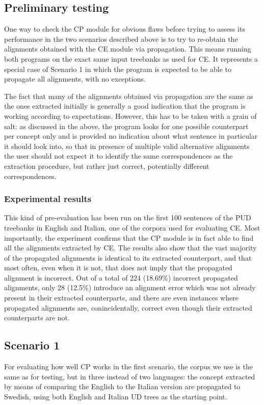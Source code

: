 \subsection{Preliminary testing} 
One way to check the CP module for obvious flaws before trying to assess its performance in the two scenarios described above is to try to re-obtain the alignments obtained with the CE module via propagation. This means running both programs on the exact same input treebanks as used for CE. It represents a special case of Scenario 1 in which the program is expected to be able to propagate all alignments, with no exceptions. \smallskip 

The fact that many of the alignments obtained via propagation are the same as the ones extracted initially is generally a good indication that the program is working according to expectations. However, this has to be taken with a grain of salt: as discussed in the above, the program looks for one possible counterpart per concept only and is provided no indication about what sentence in particular it should look into, so that in presence of multiple valid alternative alignments the user should not expect it to identify the same correspondences as the extraction procedure, but rather just correct, potentially different correspondences. 

\subsubsection{Experimental results} \label{eval4r}
This kind of pre-evaluation has been run on the first 100 sentences of the PUD treebanks in English and Italian, one of the corpora used for evaluating CE. Most importantly, the experiment confirms that the CP module is in fact able to find all the alignments extracted by CE. 
The results also show that the vast majority of the propagated alignments is identical to its extracted counterpart, and that most often, even when it is not, that does not imply that the propagated alignment is incorrect. Out of a total of 224 (18.69\%) incorrect propagated alignments, only 28 (12.5\%) introduce an alignment error which was not already present in their extracted counterparts, and there are even instances where propagated alignments are, conincidentally, correct even though their extracted counterparts are not.

\subsection{Scenario 1}
For evaluating how well CP works in the first scenario, the corpus we use is the same as for testing, but in three instead of two languages: the concept extracted by means of comparing the English to the Italian version are propagated to Swedish, using both English and Italian UD trees as the starting point. \smallskip

